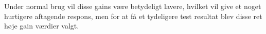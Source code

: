 Under normal brug vil disse gains være betydeligt lavere, hvilket vil give et noget hurtigere aftagende respons, men for at få et tydeligere test resultat blev disse ret høje gain værdier valgt.
%

